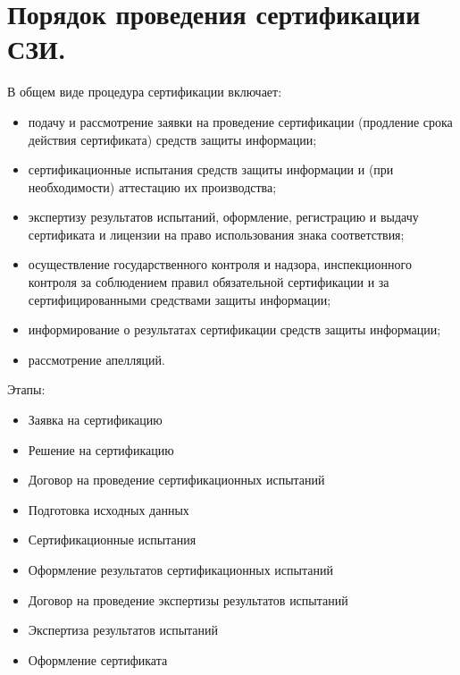 \section{Порядок проведения сертификации СЗИ.}

В общем виде процедура сертификации включает:
\begin{itemize}
\item подачу и рассмотрение заявки на проведение сертификации (продление срока
действия сертификата) средств защиты информации;
\item сертификационные испытания средств защиты информации и (при необходимости)
аттестацию их производства;
\item экспертизу результатов испытаний, оформление, регистрацию и выдачу сертификата и
лицензии на право использования знака соответствия;
\item осуществление государственного контроля и надзора, инспекционного контроля за
соблюдением правил обязательной сертификации и за сертифицированными
средствами защиты информации;
\item информирование о результатах сертификации средств защиты информации;
\item рассмотрение апелляций.
\end{itemize}

Этапы:

\begin{itemize}
	\item Заявка на сертификацию
	\item Решение на сертификацию
	\item Договор на проведение сертификационных испытаний
	\item Подготовка исходных данных
	\item Сертификационные испытания
	\item Оформление результатов сертификационных испытаний
	\item Договор на проведение экспертизы результатов испытаний
	\item Экспертиза результатов испытаний
	\item Оформление сертификата
\end{itemize}